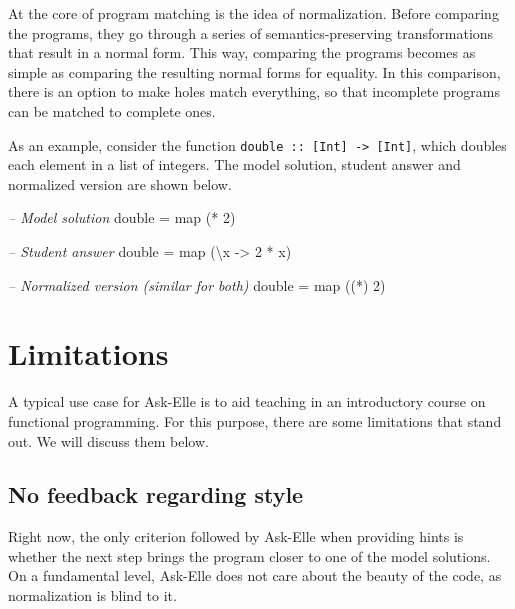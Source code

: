 \documentclass[a4paperpaper,]{report}
\newenvironment{Shaded}{}{}
\newcommand{\DecValTok}[1]{\textcolor[rgb]{0.25,0.63,0.44}{#1}}
\newcommand{\CommentTok}[1]{\textcolor[rgb]{0.38,0.63,0.69}{\textit{#1}}}
\newcommand{\OtherTok}[1]{\textcolor[rgb]{0.00,0.44,0.13}{#1}}
\newcommand{\FunctionTok}[1]{\textcolor[rgb]{0.02,0.16,0.49}{#1}}
\newcommand{\NormalTok}[1]{#1}
\begin{document}
At the core of program matching is the idea of normalization. Before
comparing the programs, they go through a series of semantics-preserving
transformations that result in a normal form. This way, comparing the
programs becomes as simple as comparing the resulting normal forms for
equality. In this comparison, there is an option to make holes match
everything, so that incomplete programs can be matched to complete ones.

As an example, consider the function
\texttt{double\ ::\ {[}Int{]}\ -\textgreater{}\ {[}Int{]}}, which
doubles each element in a list of integers. The model solution, student
answer and normalized version are shown below.

\begin{Shaded}
\begin{Highlighting}[]
\CommentTok{-- Model solution}
\NormalTok{double }\FunctionTok{=}\NormalTok{ map (}\FunctionTok{*} \DecValTok{2}\NormalTok{)}

\CommentTok{-- Student answer}
\NormalTok{double }\FunctionTok{=}\NormalTok{ map (\textbackslash{}x }\OtherTok{->} \DecValTok{2} \FunctionTok{*}\NormalTok{ x)}

\CommentTok{-- Normalized version (similar for both)}
\NormalTok{double }\FunctionTok{=}\NormalTok{ map ((}\FunctionTok{*}\NormalTok{) }\DecValTok{2}\NormalTok{)}
\end{Highlighting}
\end{Shaded}

\hypertarget{limitations}{%
\section{Limitations}\label{limitations}}

A typical use case for Ask-Elle is to aid teaching in an introductory
course on functional programming. For this purpose, there are some
limitations that stand out. We will discuss them below.

\hypertarget{no-feedback-regarding-style}{%
\subsection{No feedback regarding
style}\label{no-feedback-regarding-style}}

Right now, the only criterion followed by Ask-Elle when providing hints
is whether the next step brings the program closer to one of the model
solutions. On a fundamental level, Ask-Elle does not care about the
beauty of the code, as normalization is blind to it.
\end{document}
